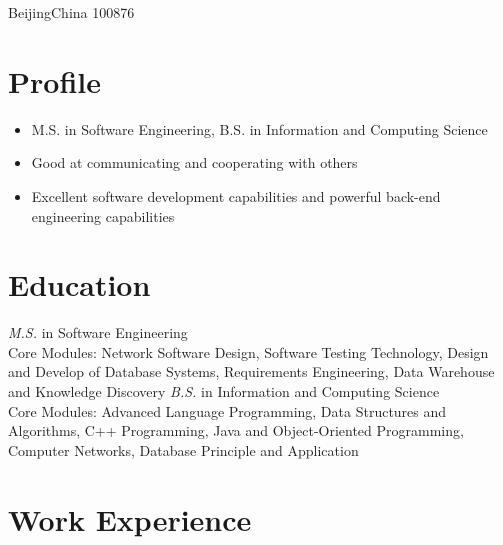 \documentclass{resume}
\begin{document}

\address{10 Xitucheng Road, Haidian Dist}{Beijing}{China 100876}


\section{Profile}
\begin{itemize}
  \item M.S. in Software Engineering, B.S. in Information and Computing Science
  \item Good at communicating and cooperating with others
  \item Excellent software development capabilities and powerful back-end engineering capabilities
\end{itemize}


\section{Education}
\textit{M.S.} in Software Engineering
\\Core Modules: Network Software Design, Software Testing Technology, Design and Develop of Database Systems, Requirements Engineering, Data Warehouse and Knowledge Discovery
\textit{B.S.} in Information and Computing Science
\\Core Modules: Advanced Language Programming, Data Structures and Algorithms, C++ Programming, Java and Object-Oriented Programming, Computer Networks, Database Principle and Application

\section{Work Experience}
\end{document}
